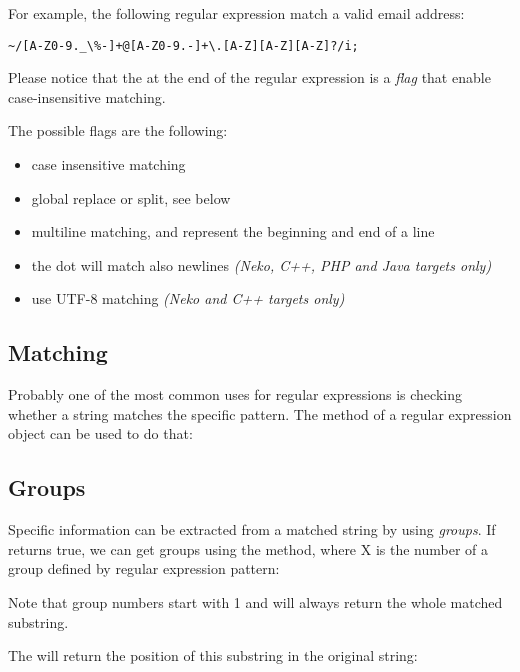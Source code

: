 \documentclass{haxe}
\begin{document}
For example, the following regular expression match a valid email address:
\begin{lstlisting}
~/[A-Z0-9._\%-]+@[A-Z0-9.-]+\.[A-Z][A-Z][A-Z]?/i;
\end{lstlisting}

Please notice that the  at the end of the regular expression is a \emph{flag} that enable case-insensitive matching.

The possible flags are the following:
\begin{itemize}
    \item {} case insensitive matching
    \item {} global replace or split, see below
    \item {} multiline matching, \expr{\textasciicircum} and \expr{\$} represent the beginning and end of a line
    \item {} the dot  will match also newlines \emph{(Neko, C++, PHP and Java targets only)}
    \item {} use UTF-8 matching \emph{(Neko and C++ targets only)}
\end{itemize}

\subsection{Matching}
\label{std-regex-match}

Probably one of the most common uses for regular expressions is checking whether a string matches the specific pattern. The  method of a regular expression object can be used to do that:

\subsection{Groups}
\label{std-regex-groups}

Specific information can be extracted from a matched string by using \emph{groups}. If  returns true, we can get groups using the  method, where X is the number of a group defined by regular expression pattern:


Note that group numbers start with 1 and  will always return the whole matched substring.

The  will return the position of this substring in the original string:
\end{document}
